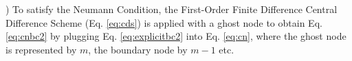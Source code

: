 \documentclass[10pt, letter, showtrims]{extarticle}
\newcommand{\boxedeq}[2]{\begin{empheq}[box={\fboxsep=6pt\fbox}]{align}\label{#1}#2\end{empheq}}
\begin{document}
		) To satisfy the Neumann Condition, the First-Order Finite Difference Central Difference Scheme (Eq. \ref{eq:cds}) is applied with a ghost node to obtain Eq. \ref{eq:cnbc2} by plugging Eq. \ref{eq:explicitbc2} into Eq. \ref{eq:cn}, where the ghost node is represented by $m$, the boundary node by $m-1$ etc.
		 
%		
%    		
%    		
%    		
%    		
%    		
%    		
%
%		
%    		
%    		
%    		
%    		
%    		
%    		
%    		
%    		
    		
\end{document}
